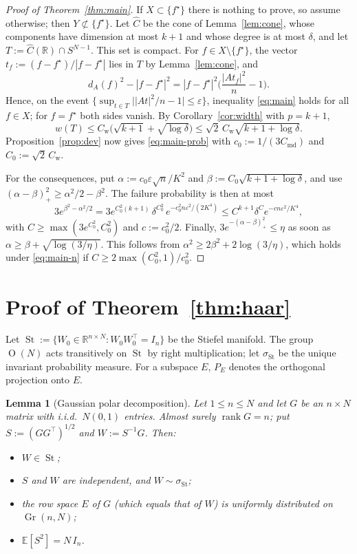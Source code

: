 \documentclass[11pt]{article}
\newtheorem{lemma}[theorem]{Lemma}
\theoremstyle{definition}
\numberwithin{equation}{section}
\newcommand{\R}{\mathbb{R}}
\newcommand{\E}{\mathbb{E}}
\newcommand{\eps}{\varepsilon}
\newcommand{\fs}{f^{\star}}
\newcommand{\Ch}{\widehat{C}}
\DeclareMathOperator{\rank}{rank}
\DeclareMathOperator{\Gr}{Gr}
\DeclareMathOperator{\St}{St}
\DeclareMathOperator{\Ort}{O}
\newcommand{\Cmd}{C_{\mathrm{md}}}
\newcommand{\Cw}{C_{\mathrm{w}}}
\begin{document}
\begin{proof}[Proof of Theorem~\ref{thm:main}]
If $X\subset\{\fs\}$ there is nothing to prove, so assume otherwise; then $Y\not\subset\{\fs\}$. Let $\Ch$ be the cone of Lemma~\ref{lem:cone}, whose components have dimension at most $k+1$ and whose degree is at most $\delta$, and let $T:=\Ch(\R)\cap S^{N-1}$. This set is compact. For $f\in X\setminus\{\fs\}$, the vector $t_f:=(f-\fs)/|f-\fs|$ lies in $T$ by Lemma~\ref{lem:cone}, and
\[
d_A(f)^2-|f-\fs|^2=|f-\fs|^2\Big(\frac{|At_f|^2}{n}-1\Big).
\]
Hence, on the event $\big\{\sup_{t\in T}\big||At|^2/n-1\big|\le\eps\big\}$, inequality \eqref{eq:main} holds for all $f\in X$; for $f=\fs$ both sides vanish. By Corollary~\ref{cor:width} with $p=k+1$,
\[
w(T)\le\Cw\big(\sqrt{k+1}+\sqrt{\log\delta}\big)\le\sqrt2\,\Cw\sqrt{k+1+\log\delta}.
\]
Proposition~\ref{prop:dev} now gives \eqref{eq:main-prob} with $c_0:=1/(3\Cmd)$ and $C_0:=\sqrt2\,\Cw$.

For the consequences, put $\alpha:=c_0\eps\sqrt n/K^2$ and $\beta:=C_0\sqrt{k+1+\log\delta}$, and use $(\alpha-\beta)_+^2\ge\alpha^2/2-\beta^2$. The failure probability is then at most
\[
3e^{\beta^2-\alpha^2/2}=3e^{C_0^2(k+1)}\,\delta^{C_0^2}\,e^{-c_0^2n\eps^2/(2K^4)}\le C^{k+1}\delta^Ce^{-cn\eps^2/K^4},
\]
with $C\ge\max(3e^{C_0^2},C_0^2)$ and $c:=c_0^2/2$. Finally, $3e^{-(\alpha-\beta)_+^2}\le\eta$ as soon as $\alpha\ge\beta+\sqrt{\log(3/\eta)}$. This follows from $\alpha^2\ge2\beta^2+2\log(3/\eta)$, which holds under \eqref{eq:main-n} if $C\ge2\max(C_0^2,1)/c_0^2$.
\end{proof}

\section{Proof of Theorem~\ref{thm:haar}}\label{sec:proof-haar}

Let $\St:=\{W_0\in\R^{n\times N}:W_0W_0^\top=I_n\}$ be the Stiefel manifold. The group $\Ort(N)$ acts transitively on $\St$ by right multiplication; let $\sigma_{\St}$ be the unique invariant probability measure. For a subspace $E$, $P_E$ denotes the orthogonal projection onto $E$.

\begin{lemma}[Gaussian polar decomposition]\label{lem:polar}
Let $1\le n\le N$ and let $G$ be an $n\times N$ matrix with i.i.d.\ $N(0,1)$ entries. Almost surely $\rank G=n$; put $S:=(GG^\top)^{1/2}$ and $W:=S^{-1}G$. Then:
\begin{itemize}
\item $W\in\St$;
\item $S$ and $W$ are independent, and $W\sim\sigma_{\St}$;
\item the row space $E$ of $G$ (which equals that of $W$) is uniformly distributed on $\Gr(n,N)$;
\item $\E[S^2]=N\,I_n$.
\end{itemize}
\end{lemma}
\end{document}
